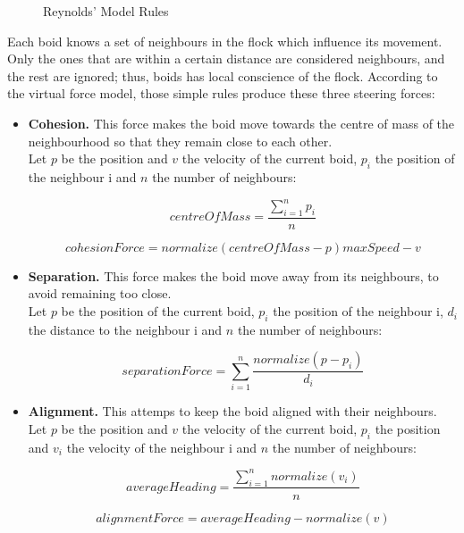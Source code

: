 \begin{figure}[!h]
\begin{tabular}{c c c}
 \end{tabular}
  \caption{Reynolds' Model Rules}
  \label{fig:crowds}
\end{figure}

Each boid knows a set of neighbours in the flock which influence its movement. Only the ones that are within a certain distance are considered neighbours, and the rest are ignored; thus, boids has local conscience of the flock. According to the virtual force model, those simple rules produce these three steering forces:

\begin{itemize}

\item{{\bf Cohesion.} This force makes the boid move towards the centre of mass of the neighbourhood so that they remain close to each other.\\

Let $p$ be the position and $v$ the velocity of the current boid, $p_i$ the position of the neighbour i and $n$ the number of neighbours:

\begin{equation}
  centreOfMass=\frac{\sum_{i=1}^np_i}{n}
\end{equation}

\begin{equation}
  cohesionForce=normalize(centreOfMass-p)maxSpeed-v
\end{equation}
}

\item{{\bf Separation.} This force makes the boid move away from its neighbours, to avoid remaining too close.\\

Let $p$ be the position of the current boid, $p_i$ the position of the neighbour i, $d_i$ the distance to the neighbour i and $n$ the number of neighbours:

\begin{equation}
  separationForce=\sum_{i=1}^n\frac{normalize(p-p_i)}{d_i}
\end{equation}
}

\item{{\bf Alignment.} This attemps to keep the boid aligned with their neighbours.\\

Let $p$ be the position and $v$ the velocity of the current boid, $p_i$ the position and $v_i$ the velocity of the neighbour i and $n$ the number of neighbours:

\begin{equation}
  averageHeading=\frac{\sum_{i=1}^nnormalize(v_i)}{n}
\end{equation}

\begin{equation}
  alignmentForce=averageHeading-normalize(v)
\end{equation}
}

\end{itemize}

